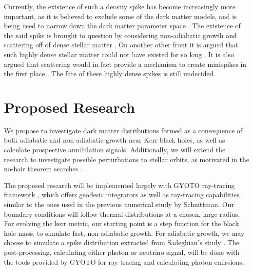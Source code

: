\documentclass[a4paper,10pt]{article}
\begin{document}
Currently, the existence of such a density spike has become 
increasingly more important, as it  
is believed to exclude some of the dark matter models, and is 
being used to narrow down the dark matter parameter space \citep{observational_get_it_from_the_criticism_article}. 
The existence of the said spike is brought to question by 
considering non-adiabatic growth and scattering off of dense 
stellar matter \citep{P_Ullio_2001}. On another other front it is 
argued that such highly dense stellar matter could not have existed 
for so long \citep{I_dont_remember_this_one}. 
It is also argued that scattering would in fact provide a mechanism 
to create 
minispikes in the first place \citep{gnedin_primack_2004}. The 
fate of these highly dense spikes is still undecided.

\section{Proposed Research}


We propose to investigate dark matter distributions formed as a consequence of both adiabatic and non-adiabatic growth near Kerr black holes, 
as well as calculate prospective annihilation signals. 
Additionally, we will extend the research to investigate possible perturbations to 
stellar orbits, as motivated in the no-hair theorem searches \citep{Sadeghian_Ferrer_Will_2013}.


The proposed research will be implemented largely with GYOTO ray-tracing framework \citep{gyoto_vincent_2011}, which 
offers geodesic integrators as well as ray-tracing capabilities similar to the ones used in the previous numerical study by 
Schnittman. Our boundary conditions will follow thermal distributions at a chosen, large radius. 
For evolving the kerr metric, our starting point is a step function for the black hole mass, to simulate fast, 
non-adiabatic growth. %
For adiabatic growth, we may choose to simulate a spike distribution extracted from Sadeghian's 
study \citep{Sadeghian_Ferrer_Will_2013}. The post-processing, calculating either photon or neutrino signal, will be done with the tools provided by GYOTO for ray-tracing and 
calculating photon emissions.
\end{document}
